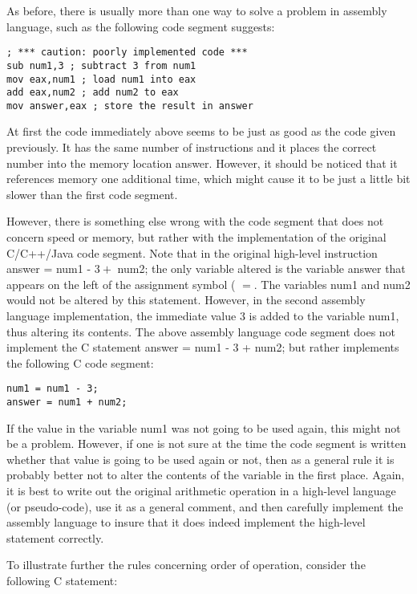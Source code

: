 \documentclass[10pt]{article}
\begin{document}
As before, there is usually more than one way to solve a problem in assembly language, such as the following code segment suggests:

\begin{verbatim}
; *** caution: poorly implemented code ***
sub num1,3 ; subtract 3 from num1
mov eax,num1 ; load num1 into eax
add eax,num2 ; add num2 to eax
mov answer,eax ; store the result in answer
\end{verbatim}

At first the code immediately above seems to be just as good as the code given previously. It has the same number of instructions and it places the correct number into the memory location answer. However, it should be noticed that it references memory one additional time, which might cause it to be just a little bit slower than the first code segment.

However, there is something else wrong with the code segment that does not concern speed or memory, but rather with the implementation of the original C/C++/Java code segment. Note that in the original high-level instruction answer = num1 - $3+$ num2; the only variable altered is the variable answer that appears on the left of the assignment symbol ( $=$. The variables num1 and num2 would not be altered by this statement. However, in the second assembly language implementation, the immediate value 3 is added to the variable num1, thus altering its contents. The above assembly language code segment does not implement the C statement answer = num1 - 3 + num2; but rather implements the following C code segment:

\begin{verbatim}
num1 = num1 - 3;
answer = num1 + num2;
\end{verbatim}

If the value in the variable num1 was not going to be used again, this might not be a problem. However, if one is not sure at the time the code segment is written whether that value is going to be used again or not, then as a general rule it is probably better not to alter the contents of the variable in the first place. Again, it is best to write out the original arithmetic operation in a high-level language (or pseudo-code), use it as a general comment, and then carefully implement the assembly language to insure that it does indeed implement the high-level statement correctly.

To illustrate further the rules concerning order of operation, consider the following C statement:
\end{document}
